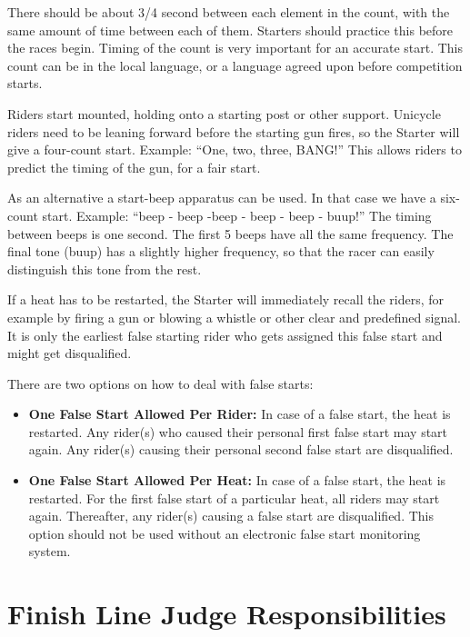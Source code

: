There should be about 3/4 second between each element in the count, with the same amount of time between each of them.
Starters should practice this before the races begin.
Timing of the count is very important for an accurate start.
This count can be in the local language, or a language agreed upon before competition starts.

Riders start mounted, holding onto a starting post or other support.
Unicycle riders need to be leaning forward before the starting gun fires, so the Starter will give a four-count start.
Example: ``One, two, three, BANG!''
This allows riders to predict the timing of the gun, for a fair start.

As an alternative a start-beep apparatus can be used.
In that case we have a six-count start.
Example: ``beep - beep -beep - beep - beep - buup!''
The timing between beeps is one second.
The first 5 beeps have all the same frequency.
The final tone (buup) has a slightly higher frequency, so that the racer can easily distinguish this tone from the rest.

If a heat has to be restarted, the Starter will immediately recall the riders, for example by firing a gun or blowing a whistle or other clear and predefined signal.
It is only the earliest false starting rider who gets assigned this false start and might get disqualified.

There are two options on how to deal with false starts:
\begin{itemize}
\item \textbf{One False Start Allowed Per Rider:}
In case of a false start, the heat is restarted.
Any rider(s) who caused their personal first false start may start again.
Any rider(s) causing their personal second false start are disqualified.
\item \textbf{One False Start Allowed Per Heat:} 
In case of a false start, the heat is restarted.
For the first false start of a particular heat, all riders may start again.
Thereafter, any rider(s) causing a false start are disqualified.
This option should not be used without an electronic false start monitoring system.
\end{itemize}

\section{Finish Line Judge Responsibilities}

